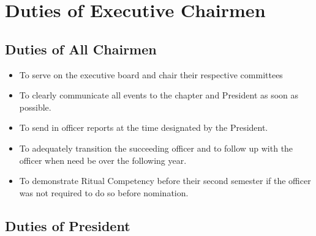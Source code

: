 \chapter{Duties of Executive Chairmen}
\label{app:duties-of-executive-chairmen}

\section{Duties of All Chairmen}
\begin{itemize}
\item To serve on the executive board and chair their respective committees
\item To clearly communicate all events to the chapter and President as soon as possible.
\item To send in officer reports at the time designated by the President.
\item To adequately transition the succeeding officer and to follow up with the officer when need be over the following year.
\item To demonstrate Ritual Competency before their second semester if the officer was not required to do so before nomination.
\end{itemize}

\section{Duties of President}

